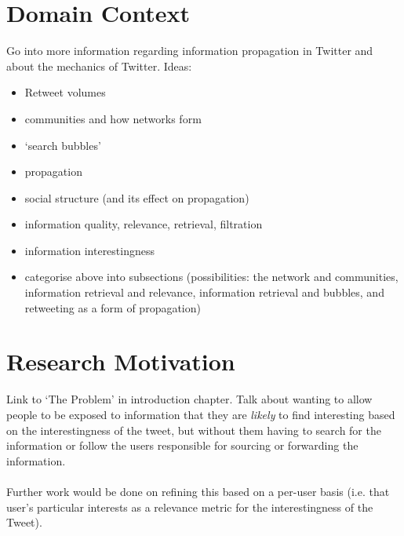 \section{Domain Context}
Go into more information regarding information propagation in Twitter and about the mechanics of Twitter. Ideas:
\begin{itemize}
\item Retweet volumes
\item communities and how networks form
\item `search bubbles'
\item propagation
\item social structure (and its effect on propagation)
\item information quality, relevance, retrieval, filtration
\item information interestingness
\item categorise above into subsections (possibilities: the network and communities, information retrieval and relevance, information retrieval and bubbles, and retweeting as a form of propagation)
\end{itemize}

\section{Research Motivation}
Link to `The Problem' in introduction chapter. Talk about wanting to allow people to be exposed to information that they are \textit{likely} to find interesting based on the interestingness of the tweet, but without them having to search for the information or follow the users responsible for sourcing or forwarding the information. \\ \\
Further work would be done on refining this based on a per-user basis (i.e. that user's particular interests as a relevance metric for the interestingness of the Tweet).